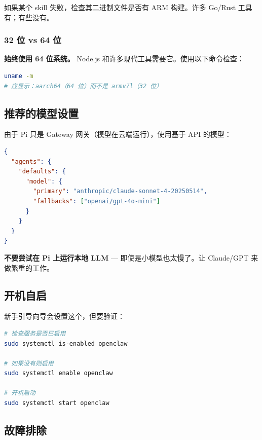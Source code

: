 如果某个 skill 失败，检查其二进制文件是否有 ARM 构建。许多 Go/Rust 工具有；有些没有。

\subsubsection{32 位 vs 64 位}


\textbf{始终使用 64 位系统。} Node.js 和许多现代工具需要它。使用以下命令检查：

\begin{lstlisting}[language=bash]
uname -m
# 应显示：aarch64（64 位）而不是 armv7l（32 位）
\end{lstlisting}


\hrulefill


\subsection{推荐的模型设置}


由于 Pi 只是 Gateway 网关（模型在云端运行），使用基于 API 的模型：

\begin{lstlisting}[language=json]
{
  "agents": {
    "defaults": {
      "model": {
        "primary": "anthropic/claude-sonnet-4-20250514",
        "fallbacks": ["openai/gpt-4o-mini"]
      }
    }
  }
}
\end{lstlisting}


\textbf{不要尝试在 Pi 上运行本地 LLM} — 即使是小模型也太慢了。让 Claude/GPT 来做繁重的工作。

\hrulefill


\subsection{开机自启}


新手引导向导会设置这个，但要验证：

\begin{lstlisting}[language=bash]
# 检查服务是否已启用
sudo systemctl is-enabled openclaw

# 如果没有则启用
sudo systemctl enable openclaw

# 开机启动
sudo systemctl start openclaw
\end{lstlisting}


\hrulefill


\subsection{故障排除}


